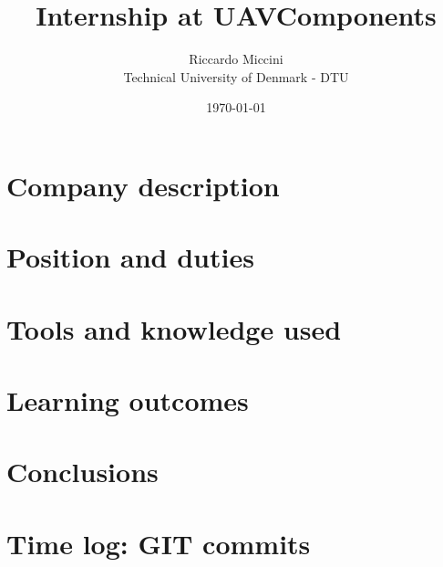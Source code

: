 \documentclass[12pt, a4paper, oneside, twocolumn, final]{article}
\title{Internship at UAVComponents}
\author{Riccardo Miccini  \\
	Technical University of Denmark - DTU \\
	}
\date{\today}
\begin{document}
\maketitle

\begin{abstract}

\end{abstract}

\tableofcontents

\section{Company description}


\section{Position and duties}


\section{Tools and knowledge used}


\section{Learning outcomes}


\section{Conclusions}


\appendix
\section{Time log: GIT commits}

\end{document}
